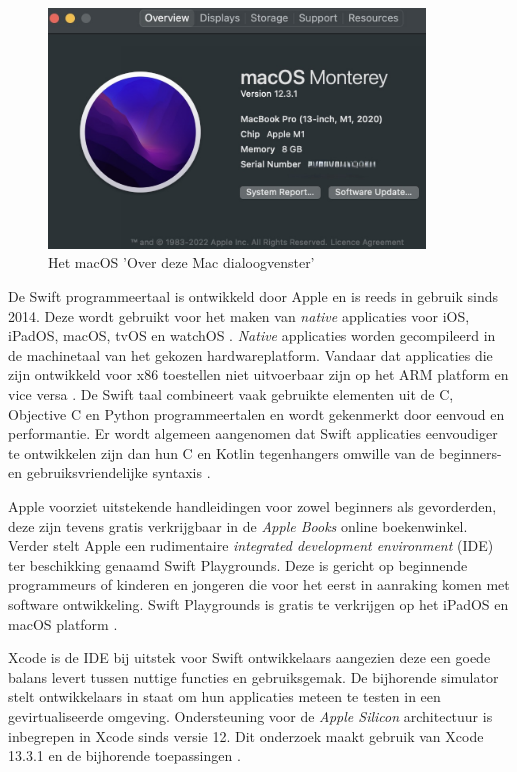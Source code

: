 \begin{figure}[h]
    \centering
    \includegraphics[width=100mm, scale=0.5]{img/overdezemac.jpeg}
    \caption{Het macOS 'Over deze Mac dialoogvenster'}
\end{figure}

De Swift programmeertaal is ontwikkeld door Apple en is reeds in gebruik sinds 2014. Deze wordt gebruikt voor het maken van \textit{native} applicaties voor iOS, iPadOS, macOS, tvOS en watchOS \autocite{AppleDeveloper2022b}. \textit{Native} applicaties worden gecompileerd in de machinetaal van het gekozen hardwareplatform. Vandaar dat applicaties die zijn ontwikkeld voor x86 toestellen niet uitvoerbaar zijn op het ARM platform en vice versa \autocite{Gillis2022}. De Swift taal combineert vaak gebruikte elementen uit de C, Objective C en Python programmeertalen en wordt gekenmerkt door eenvoud en performantie. Er wordt algemeen aangenomen dat Swift applicaties eenvoudiger te ontwikkelen zijn dan hun C en Kotlin tegenhangers omwille van de beginners- en gebruiksvriendelijke syntaxis \autocite{AppleDeveloper2022b}.

Apple voorziet uitstekende handleidingen voor zowel beginners als gevorderden, deze zijn tevens gratis verkrijgbaar in de \textit{Apple Books} online boekenwinkel. Verder stelt Apple een rudimentaire \textit{integrated development environment} (IDE) ter beschikking genaamd Swift Playgrounds. Deze is gericht op beginnende programmeurs of kinderen en jongeren die voor het eerst in aanraking komen met software ontwikkeling. Swift Playgrounds is gratis te verkrijgen op het iPadOS en macOS platform \autocite{AppleDeveloper2022b}.

Xcode is de IDE bij uitstek voor Swift ontwikkelaars aangezien deze een goede balans levert tussen nuttige functies en gebruiksgemak. De bijhorende simulator stelt ontwikkelaars in staat om hun applicaties meteen te testen in een gevirtualiseerde omgeving. Ondersteuning voor de \textit{Apple Silicon} architectuur is inbegrepen in Xcode sinds versie 12. Dit onderzoek maakt gebruik van Xcode 13.3.1 en de bijhorende toepassingen \autocite{AppleDeveloper2022a}.

